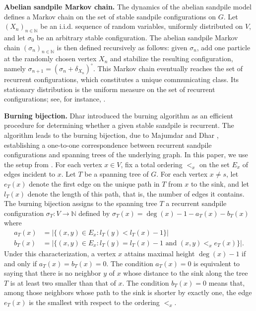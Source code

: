\documentclass[11pt]{article}
\newcommand{\N}{\mathbb{N}}
\begin{document}
\textbf{Abelian sandpile Markov chain.} 
The dynamics of the abelian sandpile model defines a Markov chain on the set of stable sandpile configurations on $G$. Let $(X_n)_{n\in\mathbb{N}}$ be an i.i.d. sequence of random variables, uniformly distributed on $V$, and let $\sigma_0$ be an arbitrary stable configuration. The abelian sandpile Markov chain $(\sigma_n)_{n\in\mathbb{N}}$ is then defined recursively as follows: given $\sigma_n$, add one particle at the randomly chosen vertex $X_n$ and stabilize the resulting configuration, namely $\sigma_{n+1}=(\sigma_n+\delta_{X_n})^\circ$.
This Markov chain eventually reaches the set of recurrent configurations, which constitutes a unique communicating class. Its stationary distribution is the uniform measure on the set of recurrent configurations; see, for instance, \cite{J18}.

\textbf{Burning bijection.} Dhar \cite{D90}  introduced the burning algorithm as an efficient procedure for determining whether a given stable sandpile is recurrent. The algorithm leads to the burning bijection, due to Majumdar and Dhar \cite{MD92}, establishing a one-to-one correspondence between recurrent sandpile configurations and spanning trees of the underlying graph. In this paper, we use the setup from \cite{LP14}. For each vertex $x\in V$, fix a total ordering $<_x$ on the set $E_x$ of edges incident to $x$. Let $T$ be a spanning tree of $G$. For each vertex $x\neq s$, let $e_T(x)$ denote the first edge on the unique path in $T$ from $x$ to the sink, and let $l_T(x)$ denote the length of this path, that is, the number of edges it contains. The burning bijection assigns to the spanning tree $T$ a recurrent sandpile configuration $\sigma_T: V \rightarrow \N$ defined by $\sigma_T(x)= \deg(x) - 1 - a_T(x) - b_T(x)$
where
\begin{align*}
    a_T(x)&= \vert \{(x,y) \in E_x : l_T(y)<l_T(x)-1\}\vert\\
    b_T(x)&= \vert \{(x,y) \in E_x : l_T(y)=l_T(x)-1 \text{ and } (x,y)<_x e_T(x)\}\vert.
\end{align*}
Under this characterization, a vertex $x$ attains maximal height $\deg(x)-1$ if and only if $a_T(x)=b_T(x)=0$.
The condition $a_T(x)=0$ is equivalent to saying that there is no neighbor $y$ of $x$ whose distance to the sink along the tree $T$ is at least two smaller than that of $x$. The condition $b_T(x)=0$ means that, among those neighbors whose path to the sink is shorter by exactly one, the edge $e_T(x)$ is the smallest with respect to the ordering $<_x$.
\end{document}
